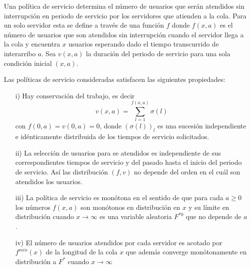 \documentclass{article}
\begin{document}
Una pol\'itica de servicio determina el n\'umero de usuarios que ser\'an
atendidos sin interrupci\'on en periodo de servicio por los
servidores que atienden a la cola. Para un solo servidor esta se
define a trav\'es de una funci\'on $f$ donde $f\left(x,a\right)$ es el
n\'umero de usuarios que son atendidos sin interrupci\'on cuando el
servidor llega a la cola y encuentra $x$ usuarios esperando dado
el tiempo transcurrido de interarribo $a$. Sea $v\left(x,a\right)$
la duraci\'on del periodo de servicio para una sola condici\'on
inicial $\left(x,a\right)$.

Las pol\'iticas de servicio consideradas satisfacen las siguientes
propiedades:

\begin{itemize}
\item[i)] Hay conservaci\'on del trabajo, es decir
\[v\left(x,a\right)=\sum_{l=1}^{f\left(x,a\right)}\sigma\left(l\right)\]
con $f\left(0,a\right)=v\left(0,a\right)=0$, donde
$\left(\sigma\left(l\right)\right)_{l}$ es una sucesi\'on
independiente e id\'enticamente distribuida de los tiempos de
servicio solicitados. \item[ii)] La selecci\'on de usuarios para se
atendidos es independiente de sus correspondientes tiempos de
servicio y del pasado hasta el inicio del periodo de servicio. As\'i
las distribuci\'on $\left(f,v\right)$ no depende del orden en el
cu\'al son atendidos los usuarios. \item[iii)] La pol\'itica de
servicio es mon\'otona en el sentido de que para cada $a\geq0$ los
n\'umeros $f\left(x,a\right)$ son mon\'otonos en distribuci\'on en $x$ y
su l\'imite en distribuci\'on cuando $x\rightarrow\infty$ es una
variable aleatoria $F^{*0}$ que no depende de $a$. \item[iv)] El
n\'umero de usuarios atendidos por cada servidor es acotado por
$f^{min}\left(x\right)$ de la longitud de la cola $x$ que adem\'as
converge mon\'otonamente en distribuci\'on a $F^{*}$ cuando
$x\rightarrow\infty$
\end{itemize}
\end{document}
